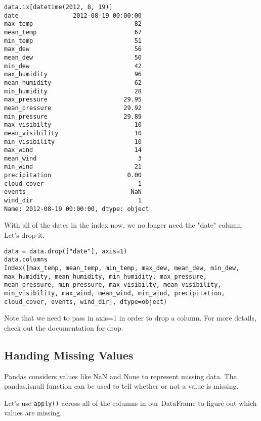 \begin{framed}
\begin{verbatim}
data.ix[datetime(2012, 8, 19)]
date               2012-08-19 00:00:00
max_temp                            82
mean_temp                           67
min_temp                            51
max_dew                             56
mean_dew                            50
min_dew                             42
max_humidity                        96
mean_humidity                       62
min_humidity                        28
max_pressure                     29.95
mean_pressure                    29.92
min_pressure                     29.89
max_visibilty                       10
mean_visibility                     10
min_visibility                      10
max_wind                            14
mean_wind                            3
min_wind                            21
precipitation                     0.00
cloud_cover                          1
events                             NaN
wind_dir                             1
Name: 2012-08-19 00:00:00, dtype: object
\end{verbatim}
\end{framed}
With all of the dates in the index now, we no longer need the "date" column. Let's drop it.

\begin{framed}
\begin{verbatim}
data = data.drop(["date"], axis=1)
data.columns
Index([max_temp, mean_temp, min_temp, max_dew, mean_dew, min_dew, max_humidity, mean_humidity, min_humidity, max_pressure, mean_pressure, min_pressure, max_visibilty, mean_visibility, min_visibility, max_wind, mean_wind, min_wind, precipitation, cloud_cover, events, wind_dir], dtype=object)
\end{verbatim}
\end{framed}

Note that we need to pass in axis=1 in order to drop a column. For more details, check out the documentation for drop.

\subsection{Handing Missing Values}
Pandas considers values like NaN and None to represent missing data. The pandas.isnull function can be used to tell whether or not a value is missing.

Let's use \texttt{apply()} across all of the columns in our DataFrame to figure out which values are missing.

